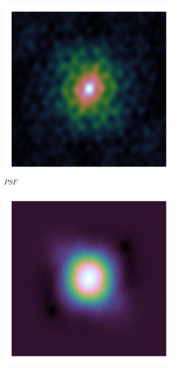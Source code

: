 \begin{figure}[h]
	\centering
	\begin{subfigure}[b]{0.245\linewidth}
		\includegraphics[width=\linewidth, clip, trim= 0.25in 0.25in 0.25in 0.25in]{./chapters/03.cd/simulated/psf.png}
		\caption{$PSF$}
	\end{subfigure}
	\begin{subfigure}[b]{0.245\linewidth}
		\includegraphics[width=\linewidth, clip, trim= 0.25in 0.25in 0.25in 0.25in]{./chapters/03.cd/simulated/psfSquared.png}

\end{subfigure}
\end{figure}
